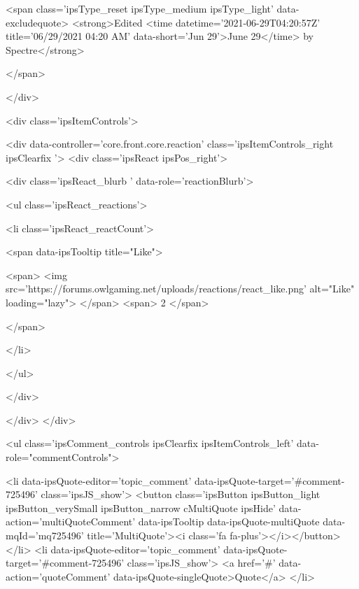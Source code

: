 			
				

<span class='ipsType_reset ipsType_medium ipsType_light' data-excludequote>
	<strong>Edited <time datetime='2021-06-29T04:20:57Z' title='06/29/2021 04:20  AM' data-short='Jun 29'>June 29</time> by Spectre</strong>
	
	
</span>
			
		</div>

		
			<div class='ipsItemControls'>
				
					
						

	<div data-controller='core.front.core.reaction' class='ipsItemControls_right ipsClearfix '>	
		<div class='ipsReact ipsPos_right'>
			
				
				<div class='ipsReact_blurb ' data-role='reactionBlurb'>
					
						

	
	<ul class='ipsReact_reactions'>
		
		
			
				
				<li class='ipsReact_reactCount'>
					
						<span data-ipsTooltip title="Like">
					
							<span>
								<img src='https://forums.owlgaming.net/uploads/reactions/react_like.png' alt="Like" loading="lazy">
							</span>
							<span>
								2
							</span>
					
						</span>
					
				</li>
			
		
	</ul>

					
				</div>
			
			
			
		</div>
	</div>

					
				
				<ul class='ipsComment_controls ipsClearfix ipsItemControls_left' data-role="commentControls">
					
						
							<li data-ipsQuote-editor='topic_comment' data-ipsQuote-target='#comment-725496' class='ipsJS_show'>
								<button class='ipsButton ipsButton_light ipsButton_verySmall ipsButton_narrow cMultiQuote ipsHide' data-action='multiQuoteComment' data-ipsTooltip data-ipsQuote-multiQuote data-mqId='mq725496' title='MultiQuote'><i class='fa fa-plus'></i></button>
							</li>
							<li data-ipsQuote-editor='topic_comment' data-ipsQuote-target='#comment-725496' class='ipsJS_show'>
								<a href='#' data-action='quoteComment' data-ipsQuote-singleQuote>Quote</a>
							</li>
						
						
						
